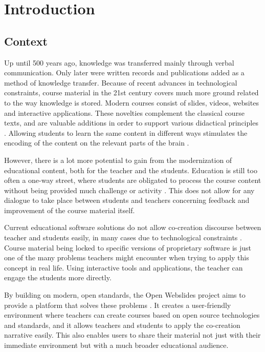 
\chapter{Introduction}
\label{ch:introduction}

\section{Context}
\label{sec:context}

Up until 500 years ago, knowledge was transferred mainly through verbal communication.
Only later were written records and publications added as a method of knowledge transfer.
Because of recent advances in technological constraints, course material in the 21st century covers much more ground related to the way knowledge is stored.
Modern courses consist of slides, videos, websites and interactive applications.
These novelties complement the classical course texts, and are valuable additions in order to support various didactical principles \autocite{Cocoon2016}.
Allowing students to learn the same content in different ways stimulates the encoding of the content on the relevant parts of the brain \autocite{Paivio1969}.

However, there is a lot more potential to gain from the modernization of educational content, both for the teacher and the students.
Education is still too often a one-way street, where students are obligated to process the course content without being provided much challenge or activity \autocite{OpenWebslides2017}.
This does not allow for any dialogue to take place between students and teachers concerning feedback and improvement of the course material itself.

Current educational software solutions do not allow co-creation discourse between teacher and students easily, in many cases due to technological constraints \autocite{Cocos2018}.
Course material being locked to specific versions of proprietary software is just one of the many problems teachers might encounter when trying to apply this concept in real life.
Using interactive tools and applications, the teacher can engage the students more directly.

By building on modern, open standards, the Open Webslides project aims to provide a platform that solves these problems \autocite{OpenWebslides2017}.
It creates a user-friendly environment where teachers can create courses based on open source technologies and standards, and it allows teachers and students to apply the co-creation narrative easily.
This also enables users to share their material not just with their immediate environment but with a much broader educational audience.

